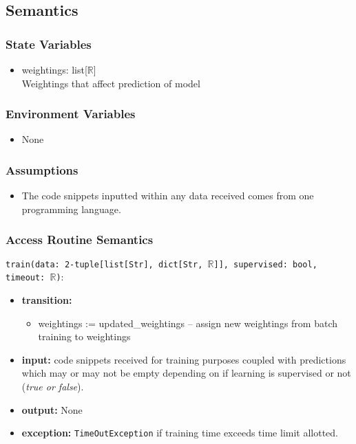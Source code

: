 \documentclass[12pt, titlepage]{article}
\begin{document}
\begin{itemize}
\subsection{Semantics}

\subsubsection{State Variables}

\begin{itemize}
    \item weightings: list[$\mathbb{R}$] \\
    Weightings that affect prediction of model
\end{itemize}

\subsubsection{Environment Variables}

\begin{itemize}
  \item None
\end{itemize}

\subsubsection{Assumptions}

\begin{itemize}
    \item The code snippets inputted within any data received comes from one programming language.
\end{itemize}
\subsubsection{Access Routine Semantics}

\noindent \texttt{train(data: 2-tuple[list[Str], dict[Str, $\mathbb{R}$]], supervised: bool, timeout: $\mathbb{R}$)}:
\begin{itemize}
    \item \textbf{transition:} 
    \begin{itemize}
        \item weightings := updated\_weightings -- assign new weightings from batch training to weightings
    \end{itemize}
    \item \textbf{input:} code snippets received for training purposes coupled with predictions which may or may not be empty depending on if learning is supervised or not (\textit{true or false}).
    \item \textbf{output:} None
    \item \textbf{exception:} \texttt{TimeOutException} if training time exceeds time limit allotted. 
\end{itemize}


\end{itemize}
\end{document}
